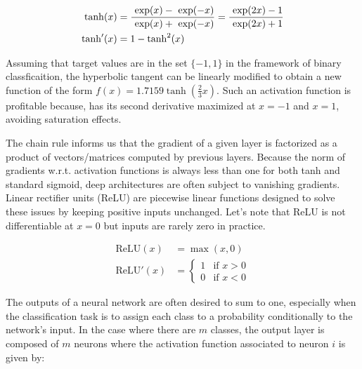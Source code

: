         \begin{equation}
            \begin{split}
                \tanh(x) & = \frac{\text{ exp}(x) - \text{ exp}(-x)}{\text{ exp}(x) + \text{ exp}(-x)} = \frac{\text{ exp}(2x) - 1}{\text{ exp}(2x) + 1} \\
                \tanh'(x) & = 1 - \tanh^2(x)
            \end{split}
        \end{equation}

        Assuming that target values are in the set $\{-1, 1\}$ in the framework of binary classficaition,
        the hyperbolic tangent can be linearly modified to obtain a new function of the form $f(x) = 1.7159 \tanh(\frac{2}{3} x)$.
        Such an activation function is profitable because, has its second derivative maximized at $x = -1$ and $x = 1$, avoiding
        saturation effects.

        The chain rule informs us that the gradient of a given layer is factorized as a product of vectors/matrices computed by previous layers.
        Because the norm of gradients w.r.t. activation functions is always less than one for both tanh and standard sigmoid,
        deep architectures are often subject to vanishing gradients. Linear rectifier units (ReLU) are piecewise linear functions designed to solve
        these issues by keeping positive inputs unchanged. Let's note that ReLU is not differentiable at $x = 0$ but inputs are rarely zero in practice.

        \begin{equation}
            \begin{split}
                \text{ReLU}(x) & = \max{(x, 0)} \\
                \text{ReLU}'(x) & = 
                \begin{cases}
                    1 & \text{if } x > 0 \\
                    0 & \text{if } x < 0
                \end{cases}
            \end{split}
        \end{equation}

        The outputs of a neural network are often desired to sum to one, especially when the classification task is to assign each class to a probability
        conditionally to the network's input. In the case where there are $m$ classes, the output layer is composed of $m$ neurons where the activation
        function associated to neuron $i$ is given by:

